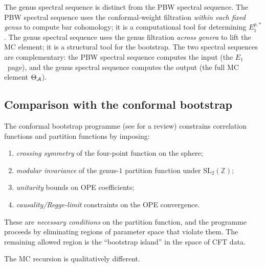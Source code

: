 \begin{remark}
The genus spectral sequence is distinct from the PBW spectral
sequence. The PBW spectral sequence uses the conformal-weight
filtration \emph{within each fixed genus} to compute bar
cohomology; it is a computational tool for determining
$E_1^{p,*}$. The genus spectral sequence uses the genus
filtration \emph{across genera} to lift the MC element; it is
a structural tool for the bootstrap. The two spectral sequences
are complementary: the PBW spectral sequence computes the input
(the $E_1$~page), and the genus spectral sequence computes the
output (the full MC element $\Theta_{\mathcal{A}}$).
\end{remark}

%
%

\subsection{Comparison with the conformal bootstrap}

The conformal bootstrap programme (see \cite{BPRS15} for a review)
constrains correlation functions and partition functions by
imposing:
\begin{enumerate}[label=(\alph*)]
\item \emph{crossing symmetry} of the four-point function on the
 sphere;
\item \emph{modular invariance} of the genus-$1$ partition
 function under $\mathrm{SL}_2(\mathbb{Z})$;
\item \emph{unitarity} bounds on OPE coefficients;
\item \emph{causality/Regge-limit} constraints on the OPE
 convergence.
\end{enumerate}
These are \emph{necessary conditions} on the partition function,
and the programme proceeds by eliminating regions of parameter
space that violate them. The remaining allowed region is the
``bootstrap island'' in the space of CFT data.

The MC recursion is qualitatively different.

